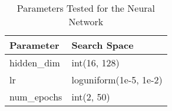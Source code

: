 \begin{table}[t]
\centering
\caption{Parameters Tested for the Neural Network}
\label{tab:nn_params}
\begin{tabular}{|l|l|}
\hline
\textbf{Parameter} & \textbf{Search Space}      \\ \hline
hidden\_dim        & int(16, 128)               \\ \hline
lr                 & loguniform(1e-5, 1e-2)     \\ \hline
num\_epochs        & int(2, 50)                 \\ \hline
\end{tabular}
\end{table}